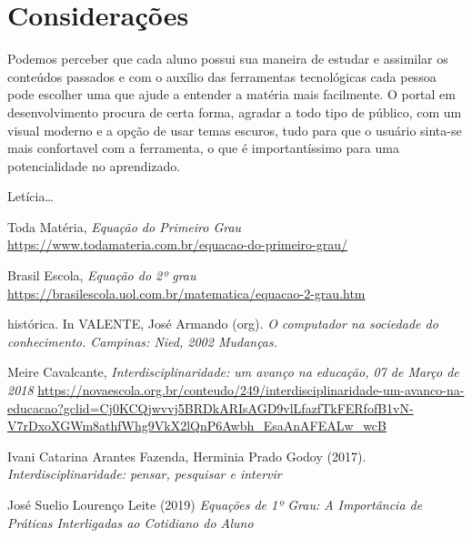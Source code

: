 \documentclass[12pt]{report}
\begin{document}
\chapter{Considerações}
Podemos perceber que cada aluno possui sua maneira de estudar e assimilar os conteúdos passados e com o auxílio das ferramentas tecnológicas cada pessoa pode escolher uma que ajude a entender a matéria mais facilmente. O portal em desenvolvimento procura de certa forma, agradar a todo tipo de público, com um visual moderno e a opção de usar temas escuros, tudo para que o usuário sinta-se mais confortavel com a ferramenta, o que é importantíssimo para uma potencialidade no aprendizado.

Letícia\dots

\begin{thebibliography}{9}

\noindent Toda Matéria, 
\textit{Equação do Primeiro Grau}
\url{https://www.todamateria.com.br/equacao-do-primeiro-grau/}

\noindent Brasil Escola, 
\textit{Equação do 2º grau}
\url{https://brasilescola.uol.com.br/matematica/equacao-2-grau.htm}

\noindent histórica. In VALENTE, José Armando (org). 
\textit{O computador na sociedade do conhecimento. Campinas: Nied, 2002 Mudanças.}

\noindent Meire Cavalcante,
\textit{Interdisciplinaridade: um avanço na educação, 07 de Março de 2018}
\url{https://novaescola.org.br/conteudo/249/interdisciplinaridade-um-avanco-na-educacao?gclid=Cj0KCQjwvvj5BRDkARIsAGD9vlLfazfTkFERfofB1vN-V7rDxoXGWm8athfWhg9VkX2lQnP6Awbh_EsaAnAFEALw_wcB}

\noindent Ivani Catarina Arantes Fazenda, Herminia Prado Godoy (2017).
\textit{Interdisciplinaridade: pensar, pesquisar e intervir}

\noindent José Suelio Lourenço Leite (2019)
\textit{Equações de 1º Grau: A Importância de Práticas Interligadas ao Cotidiano do Aluno}

\end{thebibliography}
\end{document}
